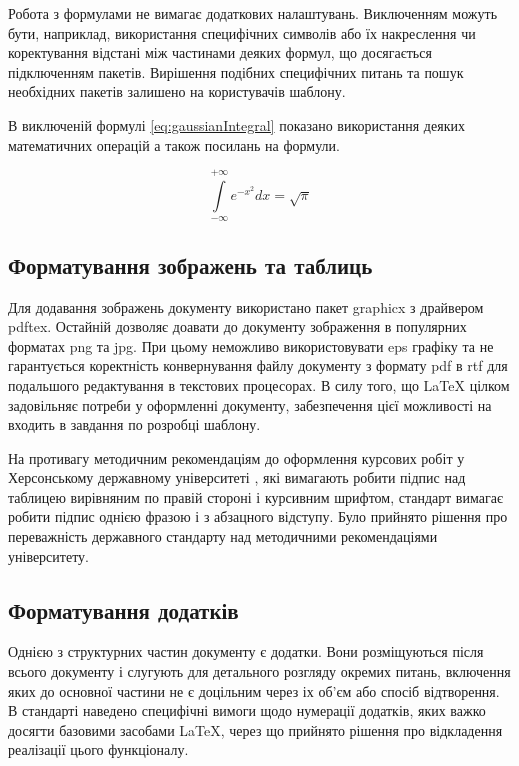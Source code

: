 Робота з формулами не вимагає додаткових налаштувань. Виключенням можуть бути, наприклад, використання специфічних символів або їх накреслення чи коректування відстані між частинами деяких формул, що досягається підключенням пакетів. Вирішення подібних специфічних питань та пошук необхідних пакетів залишено на користувачів шаблону.

В виключеній формулі \ref{eq:gaussianIntegral} показано використання деяких математичних операцій а також посилань на формули.

\begin{equation}
\label{eq:gaussianIntegral}
\int\limits^{+\infty}_{-\infty} e^{-x^2} dx = \sqrt{\pi} 
\end{equation}

\subsection{Форматування зображень та таблиць}
\label{figuresAndTablesFormat}
Для додавання зображень документу використано пакет graphicx з драйвером pdftex. Остайній дозволяє доавати до документу зображення в популярних форматах png та jpg. При цьому неможливо використовувати eps графіку та не  гарантується коректність конвернування файлу документу з формату pdf в rtf для подальшого редактування в текстових процесорах. В силу того, що \LaTeX{} цілком задовільняє потреби у оформленні документу, забезпечення цієї можливості на входить в завдання по розробці шаблону.

На противагу методичним рекомендаціям до оформлення курсових робіт у Херсонському державному університеті \cite[с.~18]{doc:methodika:1} \cite{doc:methodika:2}, які вимагають робити підпис над таблицею вирівняним по правій стороні і курсивним шрифтом, стандарт вимагає \cite[с.~10]{DSTU20153008} робити підпис однією фразою і з абзацного відступу. Було прийнято рішення про переважність державного стандарту над методичними рекомендаціями університету.

\subsection{Форматування додатків}
\label{appendixFormat}
Однією з структурних частин документу є додатки. Вони розміщуються після всього документу і слугують для детального розгляду окремих питань, включення яких до основної частини не є доцільним через іх об'єм або спосіб відтворення. В стандарті наведено специфічні вимоги щодо нумерації додатків, яких важко досягти базовими засобами \LaTeX{}, через що прийнято рішення про відкладення реалізації цього функціоналу.

